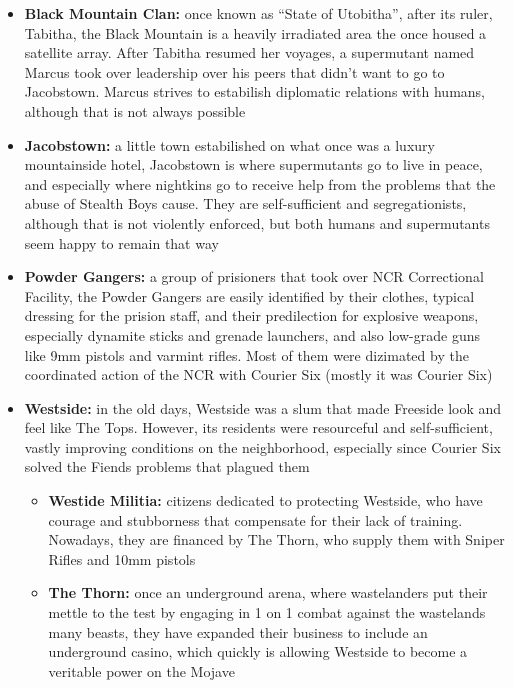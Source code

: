 \begin{itemize}
\item \textbf{Black Mountain Clan:} once known as ``State of Utobitha'', after its ruler, Tabitha, the Black Mountain is a heavily irradiated area the once housed a satellite array. After Tabitha resumed her voyages, a supermutant named Marcus took over leadership over his peers that didn't want to go to Jacobstown. Marcus strives to estabilish diplomatic relations with humans, although that is not always possible

\item \textbf{Jacobstown:} a little town estabilished on what once was a luxury mountainside hotel, Jacobstown is where supermutants go to live in peace, and especially where nightkins go to receive help from the problems that the abuse of Stealth Boys cause. They are self-sufficient and segregationists, although that is not violently enforced, but both humans and supermutants seem happy to remain that way

\item \textbf{Powder Gangers:} a group of prisioners that took over NCR Correctional Facility, the Powder Gangers are easily identified by their clothes, typical dressing for the prision staff, and their predilection for explosive weapons, especially dynamite sticks and grenade launchers, and also low-grade guns like 9mm pistols and varmint rifles. Most of them were dizimated by the coordinated action of the NCR with Courier Six (mostly it was Courier Six)
	
\item \textbf{Westside:} in the old days, Westside was a slum that made Freeside look and feel like The Tops. However, its residents were resourceful and self-sufficient, vastly improving conditions on the neighborhood, especially since Courier Six solved the Fiends problems that plagued them
	\begin{itemize}
	\item \textbf{Westide Militia:} citizens dedicated to protecting Westside, who have courage and stubborness that compensate for their lack of training. Nowadays, they are financed by The Thorn, who supply them with Sniper Rifles and 10mm pistols
	
	\item \textbf{The Thorn:} once an underground arena, where wastelanders put their mettle to the test by engaging in 1 on 1 combat against the wastelands many beasts, they have expanded their business to include an underground casino, which quickly is allowing Westside to become a veritable power on the Mojave
	\end{itemize} 


\end{itemize}
